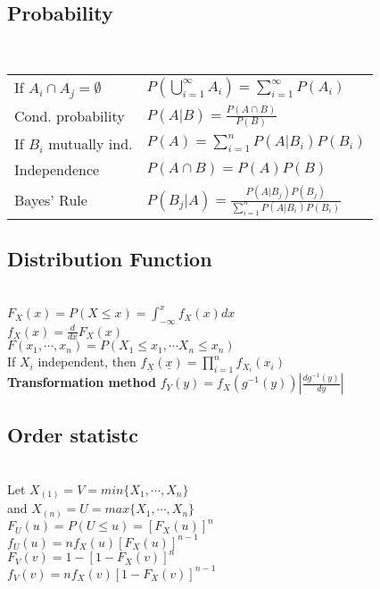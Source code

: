 \documentclass[8pt]{article}
\begin{document}
\begin{multicols}{3}
  {\itshape
  \subsection*{Probability}\\
  \begin{tabular}{l l}
    If $A_i \cap A_j = \emptyset$ &$P(\bigcup_{i=1}^{\infty} A_i) = \sum_{i=1}^{\infty} P(A_i)$\\
    Cond. probability & $P(A|B) = \frac{P(A \cap B)}{P(B)}$\\
    If $B_i$ mutually ind. & $P(A) = \sum_{i=1}^n P(A|B_i)P(B_i)$\\
    Independence & $P(A\cap B) = P(A)P(B)$\\
    Bayes' Rule & $P(B_j | A) = \frac{P(A|B_j)P(B_j)}{\sum_{i=1}^n P(A|B_i)P(B_i)}$\\
  \end{tabular}

  \subsection*{Distribution Function}\\
  $F_X(x) = P(X\leq x) = \int_{-\infty}^{x} f_X(x)dx$ \\
  $f_X(x) = \frac{d}{dx} F_X(x)$\\
  $F(x_1, \cdots, x_n) = P(X_1 \leq x_1, \cdots X_n\leq x_n)$\\
  If $X_i$ independent, then $f_{\underline{X}}(\underline{x}) = \prod_{i=1}^n f_{X_i}(x_i)$\\
  \textbf{Transformation method} $f_Y(y) = f_X(g^{-1}(y))|\frac{dg^{-1}(y)}{dy}|$


  \subsection*{Order statistc}\\
  Let $X_{(1)} = V = min\{X_1, \cdots, X_n\}$\\
  and $X_{(n)} = U = max\{X_1, \cdots, X_n\}$\\
  $F_U(u) = P(U \leq u) = [F_X(u)]^n$\\
  $f_U(u) = nf_X(u)[F_X(u)]^{n-1}$\\
  $F_V(v) = 1 - [1 - F_X(v)]^{n}$\\
  $f_V(v) = nf_X(v)[1 - F_X(v)]^{n-1}$\\


}
\end{multicols}
\end{document}
